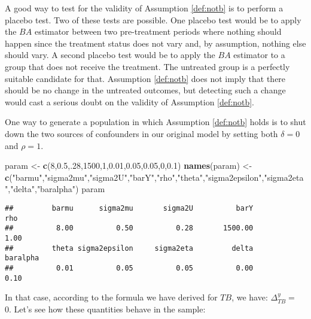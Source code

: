 \documentclass[]{book}
\newenvironment{Shaded}{\begin{snugshade}}{\end{snugshade}}
\newcommand{\KeywordTok}[1]{\textcolor[rgb]{0.13,0.29,0.53}{\textbf{#1}}}
\newcommand{\DecValTok}[1]{\textcolor[rgb]{0.00,0.00,0.81}{#1}}
\newcommand{\FloatTok}[1]{\textcolor[rgb]{0.00,0.00,0.81}{#1}}
\newcommand{\StringTok}[1]{\textcolor[rgb]{0.31,0.60,0.02}{#1}}
\newcommand{\NormalTok}[1]{#1}
\theoremstyle{definition}
\theoremstyle{definition}
\theoremstyle{definition}
\theoremstyle{remark}
\let\BeginKnitrBlock\begin \let\EndKnitrBlock\end
\begin{document}
A good way to test for the validity of Assumption \ref{def:notb} is to
perform a placebo test. Two of these tests are possible. One placebo
test would be to apply the \(BA\) estimator between two pre-treatment
periods where nothing should happen since the treatment status does not
vary and, by assumption, nothing else should vary. A second placebo test
would be to apply the \(BA\) estimator to a group that does not receive
the treatment. The untreated group is a perfectly suitable candidate for
that. Assumption \ref{def:notb} does not imply that there should be no
change in the untreated outcomes, but detecting such a change would cast
a serious doubt on the validity of Assumption \ref{def:notb}.

\BeginKnitrBlock{example}
\protect\hypertarget{exm:unnamed-chunk-31}{}{\label{exm:unnamed-chunk-31}
}One way to generate a population in which Assumption \ref{def:notb}
holds is to shut down the two sources of confounders in our original
model by setting both \(\delta=0\) and \(\rho=1\).
\EndKnitrBlock{example}

\begin{Shaded}
\begin{Highlighting}[]
\NormalTok{param <-}\StringTok{ }\KeywordTok{c}\NormalTok{(}\DecValTok{8}\NormalTok{,}\FloatTok{0.5}\NormalTok{,.}\DecValTok{28}\NormalTok{,}\DecValTok{1500}\NormalTok{,}\DecValTok{1}\NormalTok{,}\FloatTok{0.01}\NormalTok{,}\FloatTok{0.05}\NormalTok{,}\FloatTok{0.05}\NormalTok{,}\DecValTok{0}\NormalTok{,}\FloatTok{0.1}\NormalTok{)}
\KeywordTok{names}\NormalTok{(param) <-}\StringTok{ }\KeywordTok{c}\NormalTok{(}\StringTok{"barmu"}\NormalTok{,}\StringTok{"sigma2mu"}\NormalTok{,}\StringTok{"sigma2U"}\NormalTok{,}\StringTok{"barY"}\NormalTok{,}\StringTok{"rho"}\NormalTok{,}\StringTok{"theta"}\NormalTok{,}\StringTok{"sigma2epsilon"}\NormalTok{,}\StringTok{"sigma2eta"}\NormalTok{,}\StringTok{"delta"}\NormalTok{,}\StringTok{"baralpha"}\NormalTok{)}
\NormalTok{param}
\end{Highlighting}
\end{Shaded}

\begin{verbatim}
##         barmu      sigma2mu       sigma2U          barY           rho 
##          8.00          0.50          0.28       1500.00          1.00 
##         theta sigma2epsilon     sigma2eta         delta      baralpha 
##          0.01          0.05          0.05          0.00          0.10
\end{verbatim}

In that case, according to the formula we have derived for \(TB\), we
have: \(\Delta^y_{TB}=\) 0. Let's see how these quantities behave in the
sample:
\end{document}
